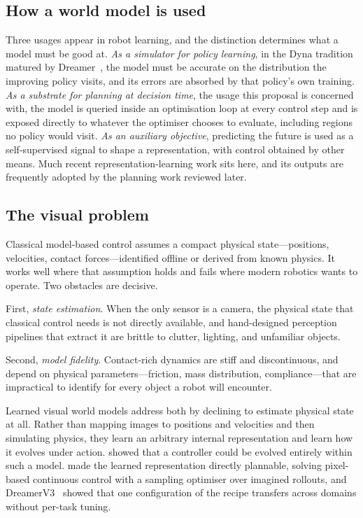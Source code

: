 \documentclass[11pt,letterpaper]{article}
\begin{document}
\subsection{How a world model is used}

Three usages appear in robot learning, and the distinction determines what a
model must be good at. \emph{As a simulator for policy learning}, in the Dyna
tradition matured by Dreamer~\citep{hafner2019planet,hafner2025dreamerv3}, the
model must be accurate on the distribution the improving policy visits, and
its errors are absorbed by that policy's own training. \emph{As a substrate
for planning at decision time}, the usage this proposal is concerned with, the
model is queried inside an optimisation loop at every control step and is
exposed directly to whatever the optimiser chooses to evaluate, including
regions no policy would visit. \emph{As an auxiliary objective}, predicting the
future is used as a self-supervised signal to shape a representation, with
control obtained by other
means. Much recent representation-learning work sits here, and its outputs are
frequently adopted by the planning work reviewed later.

\subsection{The visual problem}

Classical model-based control assumes a compact physical state---positions,
velocities, contact forces---identified offline or derived from known physics. It
works well where that assumption holds and fails where modern robotics wants to
operate. Two obstacles are decisive.

First, \emph{state estimation}. When the only sensor is a camera, the physical
state that classical control needs is not directly available, and hand-designed
perception pipelines that extract it are brittle to clutter, lighting, and
unfamiliar objects.

Second, \emph{model fidelity}. Contact-rich dynamics are stiff and
discontinuous, and depend on physical parameters---friction, mass distribution,
compliance---that are impractical to identify for every object a robot will
encounter.

Learned visual world models address both by declining to estimate physical state
at all. Rather than mapping images to positions and velocities and then
simulating physics, they learn an arbitrary internal representation and learn how
it evolves under action. \citet{ha2018worldmodels} showed that a controller could
be evolved entirely within such a model. \citet{hafner2019planet} made the
learned representation directly plannable, solving pixel-based continuous control
with a sampling optimiser over imagined rollouts, and
DreamerV3~\citep{hafner2025dreamerv3} showed that one configuration of the recipe
transfers across domains without per-task tuning.
\end{document}
